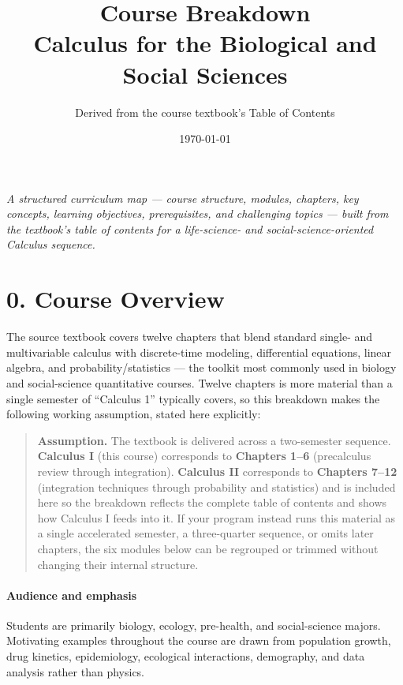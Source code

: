 \documentclass[11pt]{article}
\title{\color{primary}\textbf{Course Breakdown}\\[0.3em]
\Large Calculus for the Biological and Social Sciences}
\author{Derived from the course textbook's Table of Contents}
\date{\today}
\begin{document}
\maketitle

\begin{center}
\begin{minipage}{0.85\textwidth}
\small\itshape\centering
A structured curriculum map --- course structure, modules, chapters, key concepts,
learning objectives, prerequisites, and challenging topics --- built from the
textbook's table of contents for a life-science- and social-science-oriented
Calculus sequence.
\end{minipage}
\end{center}

\tableofcontents
\newpage

\section*{0. Course Overview}

The source textbook covers twelve chapters that blend standard single- and
multivariable calculus with discrete-time modeling, differential equations,
linear algebra, and probability/statistics --- the toolkit most commonly used
in biology and social-science quantitative courses. Twelve chapters is more
material than a single semester of ``Calculus 1'' typically covers, so this
breakdown makes the following working assumption, stated here explicitly:

\begin{quote}\small
\textbf{Assumption.} The textbook is delivered across a two-semester sequence.
\textbf{Calculus I} (this course) corresponds to \textbf{Chapters 1--6}
(precalculus review through integration). \textbf{Calculus II} corresponds to
\textbf{Chapters 7--12} (integration techniques through probability and
statistics) and is included here so the breakdown reflects the complete table
of contents and shows how Calculus I feeds into it. If your program instead
runs this material as a single accelerated semester, a three-quarter sequence,
or omits later chapters, the six modules below can be regrouped or trimmed
without changing their internal structure.
\end{quote}

\paragraph{Audience and emphasis} Students are primarily biology, ecology,
pre-health, and social-science majors. Motivating examples throughout the
course are drawn from population growth, drug kinetics, epidemiology,
ecological interactions, demography, and data analysis rather than physics.
\end{document}
